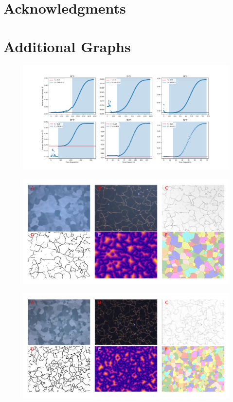 \documentclass[12pt, titlepage]{article}
\begin{document}
\section{Acknowledgments}

\printbibliography[heading=bibnumbered]

\section{Additional Graphs}

	\begin{figure}[h]
		\centering
		\includegraphics[width=1.0\linewidth]{jmak_2.png}
		\caption{}
		\label{fig:jmak_2}
	\end{figure}

	\begin{figure}[h]
		\centering
		\includegraphics[width=1.0\linewidth]{microstructure_0C.png}
		\caption{}
		\label{fig:micro_0C}
	\end{figure}

	\begin{figure}[h]
		\centering
		\includegraphics[width=1.0\linewidth]{microstructure_10C.png}
		\caption{}
		\label{fig:micro_10C}
	\end{figure}
\end{document}
